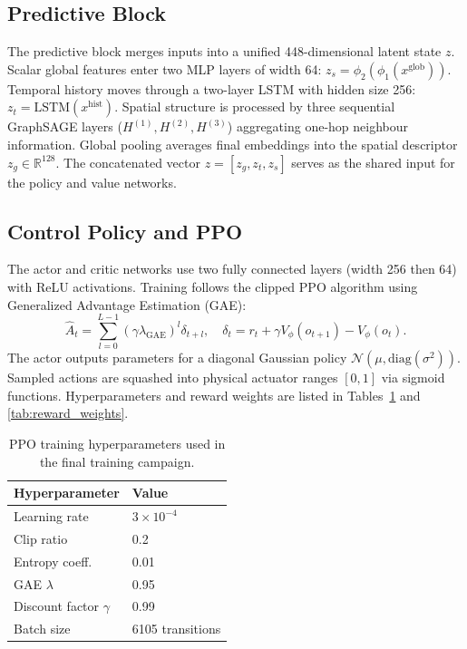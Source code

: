 \documentclass[twocolumn]{article}
\begin{document}
\subsection*{Predictive Block}

The predictive block merges inputs into a unified 448-dimensional latent state $z$.
Scalar global features enter two MLP layers of width 64: $z_s = \phi_2(\phi_1(x^{\mathrm{glob}}))$.
Temporal history moves through a two-layer LSTM with hidden size 256: $z_t = \mathrm{LSTM}(x^{\mathrm{hist}})$.
Spatial structure is processed by three sequential GraphSAGE layers ($H^{(1)}, H^{(2)}, H^{(3)}$) aggregating one-hop neighbour information.
Global pooling averages final embeddings into the spatial descriptor $z_g \in \mathbb{R}^{128}$.
The concatenated vector $z = [z_g, z_t, z_s]$ serves as the shared input for the policy and value networks.

\subsection*{Control Policy and PPO}

The actor and critic networks use two fully connected layers (width 256 then 64) with ReLU activations.
Training follows the clipped PPO algorithm using Generalized Advantage Estimation (GAE):
\begin{equation}
\hat A_t = \sum_{l=0}^{L-1} (\gamma\lambda_{\mathrm{GAE}})^l \delta_{t+l}, \quad \delta_t = r_t + \gamma V_{\phi}(o_{t+1}) - V_{\phi}(o_t).
\end{equation}
The actor outputs parameters for a diagonal Gaussian policy $\mathcal{N}(\mu, \mathrm{diag}(\sigma^2))$.
Sampled actions are squashed into physical actuator ranges $[0, 1]$ via sigmoid functions.
Hyperparameters and reward weights are listed in Tables~\ref{tab:ppo_hyperparameters} and \ref{tab:reward_weights}.

\begin{table}[!tb]
\centering
\caption{PPO training hyperparameters used in the final training campaign.}\label{tab:ppo_hyperparameters}
\small
\begin{tabular}{ll}
\hline
Hyperparameter & Value\\
\hline
Learning rate & \(3\times10^{-4}\)\\
Clip ratio & 0.2\\
Entropy coeff. & 0.01\\
GAE \(\lambda\) & 0.95\\
Discount factor \(\gamma\) & 0.99\\
Batch size & 6105 transitions\\
\hline
\end{tabular}
\end{table}
\end{document}
